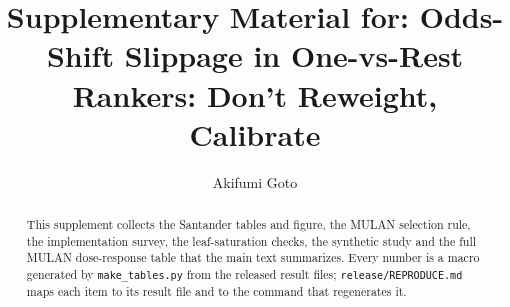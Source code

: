 \documentclass[sigconf,nonacm]{acmart}
\begin{document}
\title{Supplementary Material for: Odds-Shift Slippage in One-vs-Rest Rankers: Don't Reweight, Calibrate}

\author{Akifumi Goto}

\begin{abstract}
This supplement collects the Santander tables and figure, the MULAN selection rule, the implementation survey, the leaf-saturation checks, the synthetic study and the full MULAN dose-response table that the main text summarizes. Every number is a macro generated by \texttt{make\_tables.py} from the released result files; \texttt{release/REPRODUCE.md} maps each item to its result file and to the command that regenerates it.
\end{abstract}
\maketitle
\end{document}
